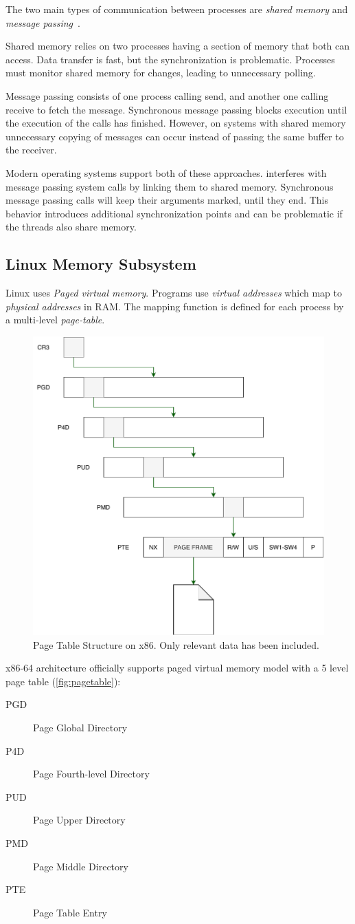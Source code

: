 The two main types of communication between processes are \emph{shared memory} 
and \emph{message passing}~\cite{silberschatz2018operating}.

Shared memory relies on two processes having a section of memory that both can 
access. Data transfer is fast, but the synchronization is problematic. 
Processes must monitor shared memory for changes, leading to unnecessary
polling.

Message passing consists of one process calling send, and another one calling
receive to fetch the message. Synchronous message passing blocks execution until
the execution of the calls has finished. However, on systems with shared memory
unnecessary copying of messages can occur instead of passing the same buffer to
the receiver.

Modern operating systems support both of these approaches. \sysname interferes
with message passing system calls by linking them to shared memory. Synchronous
message passing calls will keep their arguments marked, until they end. This
behavior introduces additional synchronization points and can be problematic if
the threads also share memory.

\subsection{Linux Memory Subsystem} \label{subsec:vm}


Linux uses \emph{Paged virtual memory}. Programs use \emph{virtual addresses}
which map to \emph{physical addresses} in RAM. The mapping function is defined
for each process by a multi-level \emph{page-table}.

\begin{figure}[]
  \centering
  \includegraphics[width = .35 \textwidth]{img/pagetable.pdf}
  \caption{Page Table Structure on x86. Only relevant data has been included.}
  \label{fig:pagetable}
\end{figure}
x86-64 architecture officially supports paged virtual memory model with a 5 
level page table (\autoref{fig:pagetable}):
\begin{description}
    \item[PGD] Page Global Directory
    \item[P4D] Page Fourth-level Directory
    \item[PUD] Page Upper Directory
    \item[PMD] Page Middle Directory
    \item[PTE] Page Table Entry
\end{description}

